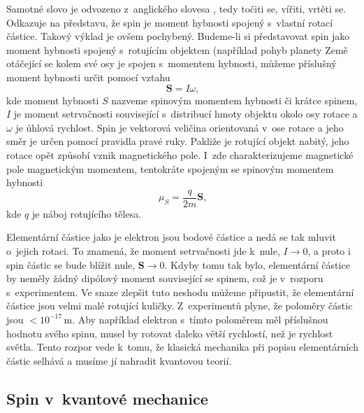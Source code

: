 Samotné slovo  je odvozeno z~anglického slovesa , tedy točiti se, vířiti, vrtěti se. Odkazuje na představu, že spin je moment hybnosti spojený s~vlastní rotací částice. Takový výklad je ovšem pochybený. Budeme-li si představovat spin jako moment hybnosti spojený s~rotujícím objektem (například pohyb planety Země otáčející se kolem své osy je spojen s~momentem hybnosti, můžeme příslušný moment hybnosti určit pomocí vztahu
\begin{equation}
\mathbf{S} = I \omega \mbox{,}
\label{rov:Spin3}
\end{equation}
kde moment hybnosti  $S$ nazveme spinovým momentem hybnosti či krátce spinem,  $I$ je moment setrvačnosti související s~distribucí hmoty objektu okolo osy rotace a $\omega$ je úhlová rychlost. Spin je vektorová veličina orientovaná v~ose rotace a jeho směr je určen pomocí pravidla pravé ruky. Pakliže je rotující objekt nabitý, jeho rotace opět způsobí vznik magnetického pole. I~zde charakterizujeme magnetické pole magnetickým momentem, tentokráte spojeným se spinovým momentem hybnosti
\begin{equation}
\mu_S = \frac{q}{2m}\mathbf{S} \mbox{,}
\label{rov:Spin4}
\end{equation}
kde $q$ je náboj rotujícího tělesa.

Elementární částice jako je elektron jsou bodové částice a nedá se tak mluvit o~jejich rotaci. To znamená, že moment setrvačnosti jde k~nule, $I \rightarrow 0$, a proto i spin částic se bude blížit nule, $\mathbf{S} \rightarrow 0$. Kdyby tomu tak bylo, elementární částice by neměly žádný dipólový moment související se spinem, což je v~rozporu s~experimentem. Ve snaze zlepšit tuto neshodu můžeme připustit, že elementární částice jsou velmi malé rotující kuličky. Z~experimentů plyne, že poloměry částic jsou $< 10^{-17} \,\mbox{m}$. Aby například elektron s~tímto poloměrem měl příslušnou hodnotu svého spinu, musel by rotovat daleko větší rychlostí, než je rychlost světla. Tento rozpor vede k~tomu, že klasická mechanika při popisu elementárních částic selhává a musíme jí nahradit kvantovou teorií.


\subsection{Spin v~kvantové mechanice}
\label{kap:Spin-QM}

